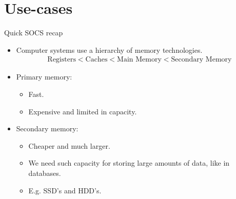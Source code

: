 \documentclass[11pt,t]{beamer}
\begin{document}
	\section{Use-cases}

	\begin{frame}{Quick SOCS recap}
		\begin{itemize}[<+->]
			\item Computer systems use a hierarchy of memory technologies. \onslide<+-> \begin{align*}
				\text{Registers} < \text{Caches} < \text{Main Memory} < \text{Secondary Memory}
			\end{align*}
			\item Primary memory: \begin{itemize}[<+->]
				\item Fast.
				\item Expensive and limited in capacity.
			\end{itemize}
			\item Secondary memory: \begin{itemize}[<+->]
				\item Cheaper and much larger.
				\item We need such capacity for storing large amounts of data, like in databases.
				\item E.g. SSD's and HDD's.
			\end{itemize}
		\end{itemize}
	\end{frame}
\end{document}
